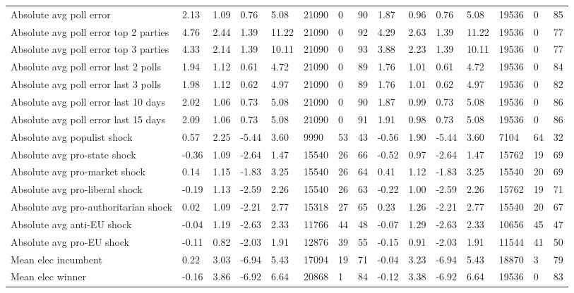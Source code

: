 \begin{longtable}{lllllllllllllll}
Absolute avg poll error & 2.13 & 1.09 & 0.76 & 5.08 & 21090 & 0 & 90 & 1.87 & 0.96 & 0.76 & 5.08 & 19536 & 0 & 85\\
Absolute avg poll error top 2 parties & 4.76 & 2.44 & 1.39 & 11.22 & 21090 & 0 & 92 & 4.29 & 2.63 & 1.39 & 11.22 & 19536 & 0 & 77\\
Absolute avg poll error top 3 parties & 4.33 & 2.14 & 1.39 & 10.11 & 21090 & 0 & 93 & 3.88 & 2.23 & 1.39 & 10.11 & 19536 & 0 & 77\\
\addlinespace
Absolute avg poll error last 2 polls & 1.94 & 1.12 & 0.61 & 4.72 & 21090 & 0 & 89 & 1.76 & 1.01 & 0.61 & 4.72 & 19536 & 0 & 84\\
Absolute avg poll error last 3 polls & 1.98 & 1.12 & 0.62 & 4.97 & 21090 & 0 & 89 & 1.76 & 1.01 & 0.62 & 4.97 & 19536 & 0 & 82\\
Absolute avg poll error last 10 days & 2.02 & 1.06 & 0.73 & 5.08 & 21090 & 0 & 90 & 1.87 & 0.99 & 0.73 & 5.08 & 19536 & 0 & 86\\
Absolute avg poll error last 15 days & 2.09 & 1.06 & 0.73 & 5.08 & 21090 & 0 & 91 & 1.91 & 0.98 & 0.73 & 5.08 & 19536 & 0 & 86\\
Absolute avg populist shock & 0.57 & 2.25 & -5.44 & 3.60 & 9990 & 53 & 43 & -0.56 & 1.90 & -5.44 & 3.60 & 7104 & 64 & 32\\
\addlinespace
Absolute avg pro-state shock & -0.36 & 1.09 & -2.64 & 1.47 & 15540 & 26 & 66 & -0.52 & 0.97 & -2.64 & 1.47 & 15762 & 19 & 69\\
Absolute avg pro-market shock & 0.14 & 1.15 & -1.83 & 3.25 & 15540 & 26 & 64 & 0.41 & 1.12 & -1.83 & 3.25 & 15540 & 20 & 69\\
Absolute avg pro-liberal shock & -0.19 & 1.13 & -2.59 & 2.26 & 15540 & 26 & 63 & -0.22 & 1.00 & -2.59 & 2.26 & 15762 & 19 & 71\\
Absolute avg pro-authoritarian shock & 0.02 & 1.09 & -2.21 & 2.77 & 15318 & 27 & 65 & 0.23 & 1.26 & -2.21 & 2.77 & 15540 & 20 & 67\\
Absolute avg anti-EU shock & -0.04 & 1.19 & -2.63 & 2.33 & 11766 & 44 & 48 & -0.07 & 1.29 & -2.63 & 2.33 & 10656 & 45 & 47\\
\addlinespace
Absolute avg pro-EU shock & -0.11 & 0.82 & -2.03 & 1.91 & 12876 & 39 & 55 & -0.15 & 0.91 & -2.03 & 1.91 & 11544 & 41 & 50\\
Mean elec incumbent & 0.22 & 3.03 & -6.94 & 5.43 & 17094 & 19 & 71 & -0.04 & 3.23 & -6.94 & 5.43 & 18870 & 3 & 79\\
Mean elec winner & -0.16 & 3.86 & -6.92 & 6.64 & 20868 & 1 & 84 & -0.12 & 3.38 & -6.92 & 6.64 & 19536 & 0 & 83\\

\end{longtable}
